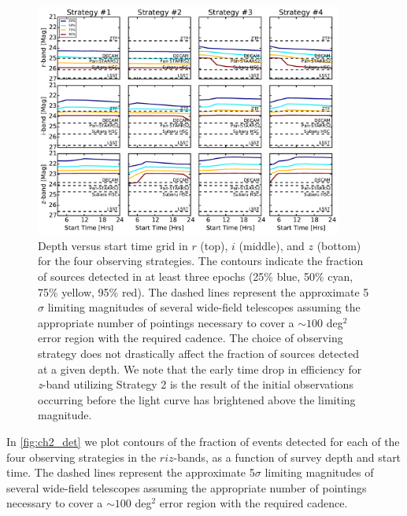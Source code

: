 \begin{figure}[t!]
\centering
\includegraphics[width=0.9\textwidth]{./figs/chapter2/ch2_f4.pdf}
\caption{Depth versus start time grid in $r$ (top), $i$ (middle), and $z$ (bottom) for the four observing strategies. The contours indicate the fraction of sources detected in at least three epochs (25\% blue, 50\% cyan, 75\% yellow, 95\% red). The dashed lines represent the approximate 5$\sigma$ limiting magnitudes of several wide-field telescopes assuming the appropriate number of pointings necessary to cover a $\sim 100$ deg$^2$ error region with the required cadence. The choice of observing strategy does not drastically affect the fraction of sources detected at a given depth. We note that the early time drop in efficiency for {\em z}-band utilizing Strategy 2 is the result of the initial observations occurring before the light curve has brightened above the limiting magnitude.}
\label{fig:ch2_det}
\end{figure}

In \autoref{fig:ch2_det} we plot contours of the fraction of events detected for each of the four observing strategies in the $riz$-bands, as a function of survey depth and start time. The dashed lines represent the approximate 5$\sigma$ limiting magnitudes of several wide-field telescopes assuming the appropriate number of pointings necessary to cover a $\sim 100$ deg$^2$ error region with the required cadence.

